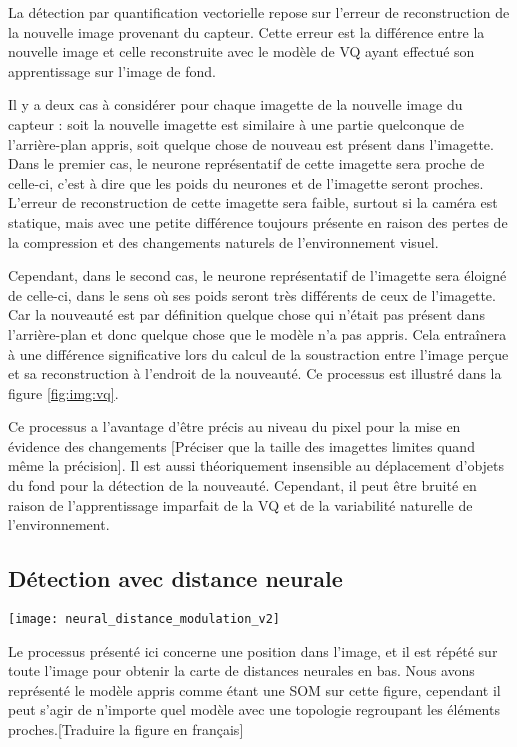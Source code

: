 	La détection par quantification vectorielle repose sur l'erreur de reconstruction de la nouvelle image provenant du capteur. Cette erreur est la différence entre la nouvelle image et celle reconstruite avec le modèle de VQ ayant effectué son apprentissage sur l'image de fond.

	Il y a deux cas à considérer pour chaque imagette de la nouvelle image du capteur : soit la nouvelle imagette est similaire à une partie quelconque de l'arrière-plan appris, soit quelque chose de nouveau est présent dans l'imagette. Dans le premier cas, le neurone représentatif de cette imagette sera proche de celle-ci, c'est à dire que les poids du neurones et de l'imagette seront proches. L'erreur de reconstruction de cette imagette sera faible, surtout si la caméra est statique, mais avec une petite différence toujours présente en raison des pertes de la compression et des changements naturels de l'environnement visuel.
	
	Cependant, dans le second cas, le neurone représentatif de l'imagette sera éloigné de celle-ci, dans le sens où ses poids seront très différents de ceux de l'imagette. Car la nouveauté est par définition quelque chose qui n'était pas présent dans l'arrière-plan et donc quelque chose que le modèle n'a pas appris. Cela entraînera à une différence significative lors du calcul de la soustraction entre l'image perçue et sa reconstruction à l'endroit de la nouveauté. Ce processus est illustré dans la figure \ref{fig:img:vq}. 

	Ce processus a l'avantage d'être précis au niveau du pixel pour la mise en évidence des changements [Préciser que la taille des imagettes limites quand même la précision]. Il est aussi théoriquement insensible au déplacement d'objets du fond pour la détection de la nouveauté. Cependant, il peut être bruité en raison de l'apprentissage imparfait de la VQ et de la variabilité naturelle de l'environnement.

	\subsection{Détection avec distance neurale}

	\begin{figureth}
		\texttt{[image: neural\_distance\_modulation\_v2]}
		\caption[Détection de nouveauté avec topologie]{Le processus présenté ici concerne une position dans l'image, et il est répété sur toute l'image pour obtenir la carte de distances neurales en bas. Nous avons représenté le modèle appris comme étant une SOM sur cette figure, cependant il peut s'agir de n'importe quel modèle avec une topologie regroupant les éléments proches.[Traduire la figure en français]}\label{fig:img:topo}
	\end{figureth}

